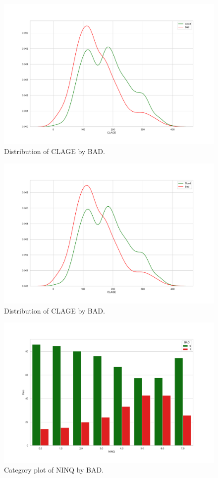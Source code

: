 \begin{figure}[!ht]
	\centering
	\includegraphics[scale=0.40]{figs/clage_dist.pdf}
	\caption{Distribution of CLAGE by BAD. \label{clage_dist}}
\end{figure}

\begin{figure}[!ht]
	\centering
	\includegraphics[scale=0.40]{figs/clage_dist.pdf}
	\caption{Distribution of CLAGE by BAD. \label{clage_dist}}
\end{figure}

\begin{figure}[!ht]
	\centering
	\includegraphics[scale=0.40]{figs/ninq_cat.pdf}
	\caption{Category plot of NINQ by BAD. \label{ninq_cat}}
\end{figure}

